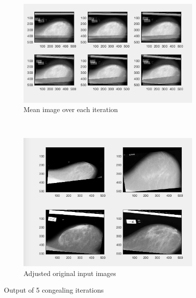 \documentclass[11pt,fleqn,twoside]{article}
\begin{document}
\begin{figure}
    \centering
    \begin{subfigure}[b]{0.4\textwidth}
        \includegraphics[width=\textwidth]{img/iteration-mean.png}
        \caption{Mean image over each iteration}
        \label{fig:mean-imgs}
    \end{subfigure}
    ~ %
    \begin{subfigure}[b]{0.4\textwidth}
        \includegraphics[width=\textwidth]{img/adj-ser.png}
        \caption{Adjusted original input images}
        \label{fig:adj-ser}
    \end{subfigure}
    \caption{Output of 5 congealing iterations}\label{fig:mammo-results}
\end{figure}
\end{document}
